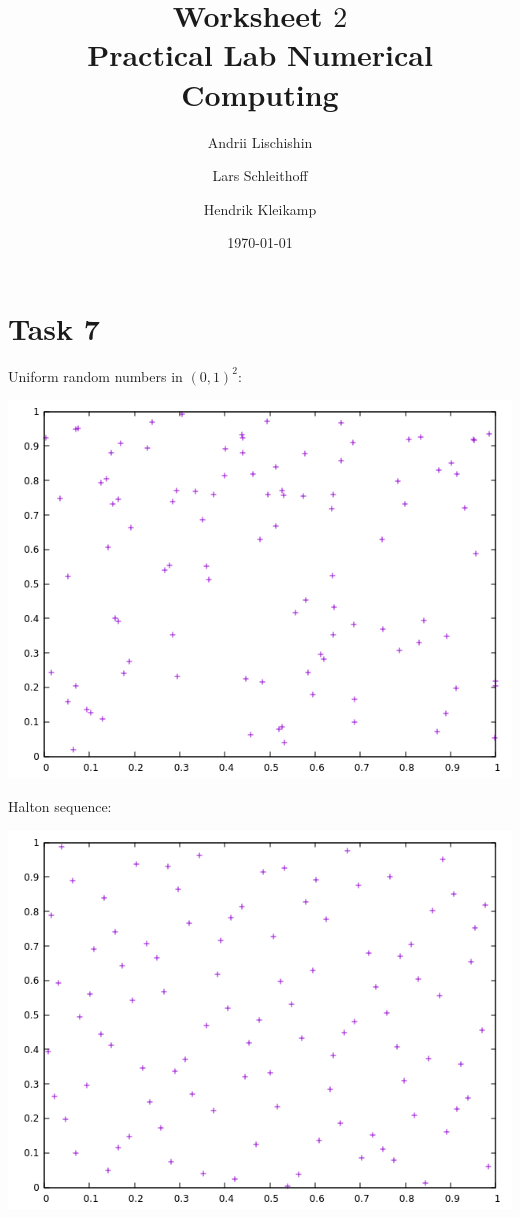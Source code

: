 \documentclass[10pt,a4paper]{article}
\begin{document}
\title{Worksheet $2$\\
\small{Practical Lab Numerical Computing}}
\author{Andrii Lischishin \and Lars Schleithoff \and Hendrik Kleikamp}
\date{\today}
\maketitle

\section*{Task 7}

Uniform random numbers in $(0,1)^2$:
\begin{center}
\includegraphics[scale=0.5]{uniform_random_numbers.png}		
\end{center}

Halton sequence:
\begin{center}
\includegraphics[scale=0.5]{halton_sequence.png}		
\end{center}
\end{document}
